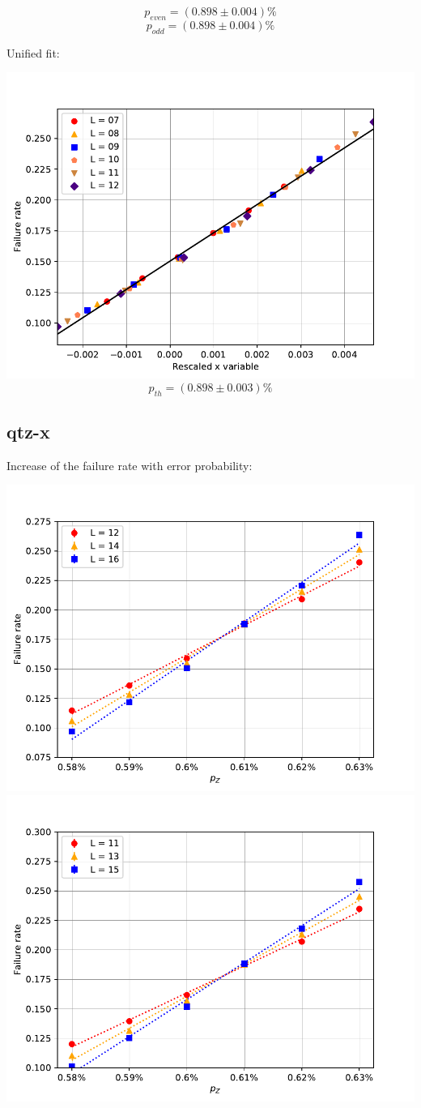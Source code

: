 \documentclass[pra]{revtex4-1}
\begin{document}
\[  p_{even} = (0.898 \pm 0.004)\% \]
\[  p_{odd} = (0.898 \pm 0.004)\% \]
\clearpage 

Unified fit: \begin{center} 

\includegraphics[width=.9\textwidth]{../graphs-paper2/pyr-dephasing-rescaled.pdf}
\[  p_{th} = (0.898 \pm 0.003)\% \] \end{center}
\clearpage 

\subsection*{qtz-x}
\noindent Increase of the failure rate with error probability: 
  
\includegraphics[width=.49\textwidth]{../graphs-paper2/qtz-x-dephasing-even.pdf}
\includegraphics[width=.49\textwidth]{../graphs-paper2/qtz-x-dephasing-odd.pdf}
\end{document}
